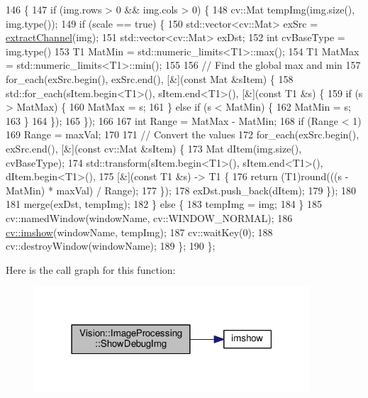 \begin{DoxyCode}
146                                               \{
147     \textcolor{keywordflow}{if} (img.rows > 0 && img.cols > 0) \{
148       cv::Mat tempImg(img.size(), img.type());
149       \textcolor{keywordflow}{if} (scale == \textcolor{keyword}{true}) \{
150         std::vector<cv::Mat> exSrc = \hyperlink{class_vision_1_1_image_processing_ad5fa51caaabb8cb0fc2c15f645695a3c}{extractChannel}(img);
151         std::vector<cv::Mat> exDst;
152         \textcolor{keywordtype}{int} cvBaseType = img.type() %
153         T1 MatMin = std::numeric\_limits<T1>::max();
154         T1 MatMax = std::numeric\_limits<T1>::min();
155 
156         \textcolor{comment}{// Find the global max and min}
157         for\_each(exSrc.begin(), exSrc.end(), [&](\textcolor{keyword}{const} Mat &sItem) \{
158           std::for\_each(sItem.begin<T1>(), sItem.end<T1>(), [&](\textcolor{keyword}{const} T1 &s) \{
159             if (s > MatMax) \{
160               MatMax = s;
161             \} \textcolor{keywordflow}{else} if (s < MatMin) \{
162               MatMin = s;
163             \}
164           \});
165         \});
166 
167         \textcolor{keywordtype}{int} Range = MatMax - MatMin;
168         \textcolor{keywordflow}{if} (Range < 1)
169           Range = maxVal;
170 
171         \textcolor{comment}{// Convert the values}
172         for\_each(exSrc.begin(), exSrc.end(), [&](\textcolor{keyword}{const} cv::Mat &sItem) \{
173           Mat dItem(img.size(), cvBaseType);
174           std::transform(sItem.begin<T1>(), sItem.end<T1>(), dItem.begin<T1>(),
175                          [&](\textcolor{keyword}{const} T1 &s) -> T1 \{
176                            return (T1)round(((s - MatMin) * maxVal) / Range);
177                          \});
178           exDst.push\_back(dItem);
179         \});
180 
181         merge(exDst, tempImg);
182       \} \textcolor{keywordflow}{else} \{
183         tempImg = img;
184       \}
185       cv::namedWindow(windowName, cv::WINDOW\_NORMAL);
186       \hyperlink{_comparision_pictures_2_createtest_image_8m_ab203292116da4a8a72763ec58b04da8f}{cv::imshow}(windowName, tempImg);
187       cv::waitKey(0);
188       cv::destroyWindow(windowName);
189     \};
190   \};
\end{DoxyCode}


Here is the call graph for this function\+:\nopagebreak
\begin{figure}[H]
\begin{center}
\leavevmode
\includegraphics[width=291pt]{class_vision_1_1_image_processing_a97407ef83de37496d30d6defe3165edd_cgraph}
\end{center}
\end{figure}




